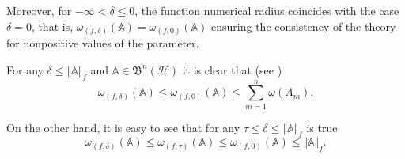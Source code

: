 \documentclass[12pt]{article}
\begin{document}
Moreover, for $-\infty<\delta\leq 0$, the function numerical radius coincides with the case $\delta=0$, that is, $  \omega_{(f,\delta)}(\mathbb{A}) = \omega_{(f,0)}(\mathbb{A}) $  ensuring the consistency of the theory for nonpositive values of the parameter.

For any $ \delta\leq \Vert \mathbb{A} \Vert_{f}  $ and $ \mathbb{A}\in \mathfrak{B}^{n}(\mathcal{H}) $ it is clear that (see \cite[Thm. 2.1]{Alomari2024})
\[
\omega_{(f,\delta)}(\mathbb{A})\leq \omega_{(f,0)}(\mathbb{A})\leq \sum\limits_{m=1}^{n}\omega (A_{m}).
\]

On the other hand, it is easy to see that for any $ \tau \leq \delta \leq \Vert \mathbb{A} \Vert_{f} $ is true
\[
\omega_{(f,\delta)}(\mathbb{A})\leq \omega_{(f,\tau)}(\mathbb{A})\leq \omega_{(f,0)}(\mathbb{A})\leq \Vert \mathbb{A} \Vert_{f}.
\]
\end{document}
